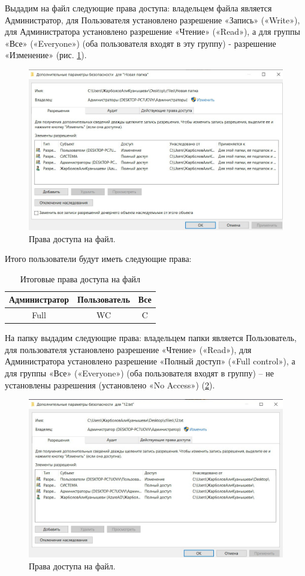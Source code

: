 Выдадим на файл следующие права доступа: владельцем файла является Администратор, для Пользователя установлено разрешение «Запись» («Write»), для Администратора установлено разрешение «Чтение» («Read»), а для группы «Все» («Everyone») (оба пользователя входят в эту группу) - разрешение «Изменение» (рис. \ref{fig:fileaccess}).

\begin{figure}[h!]
    \centering
    \includegraphics[width=0.5\linewidth]{Pic/lab3/photo_2025-05-23_20-58-49.jpg}
    \caption{Права доступа на файл.}
    \label{fig:fileaccess}
\end{figure}

Итого пользователи будут иметь следующие права: 

\begin{table}[h!]
    \centering
    \begin{tabular}{|c|c|c|}
    \hline
    Администратор&Пользователь&Все\\
    \hline
    Full&WC&C\\
    \hline
    \end{tabular}
    \caption{Итоговые права доступа на файл}
    \label{tab:31}
\end{table}

На папку выдадим следующие права: владельцем папки является Пользователь, для пользователя установлено разрешение «Чтение» («Read»), для Администратора установлено разрешение «Полный доступ» («Full control»), а для группы «Все» («Everyone») (оба пользователя входят в группу) – не установлены разрешения (установлено «No Access») (\ref{fig:diraccess}). 

\begin{figure}[h!]
    \centering
    \includegraphics[width=0.5\linewidth]{Pic/lab3/photo_2025-05-23_20-58-53.jpg}
    \caption{Права доступа на файл.}
    \label{fig:diraccess}
\end{figure}

